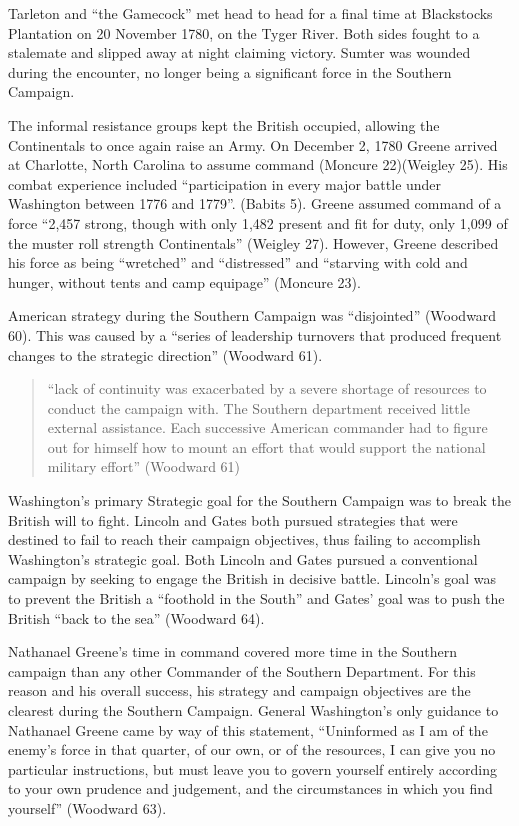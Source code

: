 Tarleton and ``the Gamecock'' met head to head for a final time at Blackstocks Plantation on 20 November 1780, on the Tyger River.  Both sides fought to a stalemate and slipped away at night claiming victory.  Sumter was wounded during the encounter, no longer being a significant force in the Southern Campaign. 

The informal resistance groups kept the British occupied, allowing the Continentals to once again raise an Army.  On December 2, 1780 Greene arrived at Charlotte, North Carolina to assume command (Moncure 22)(Weigley 25).  His combat experience included ``participation in every major battle under Washington between 1776 and 1779''. (Babits 5).  Greene assumed command of a force ``2,457 strong, though with only 1,482 present and fit for duty, only 1,099 of the muster roll strength Continentals''  (Weigley 27).   However, Greene described his force as being ``wretched'' and ``distressed'' and ``starving with cold and hunger, without tents and camp equipage'' (Moncure 23). 

American strategy during the Southern Campaign was ``disjointed'' (Woodward 60). This was caused by a ``series of leadership turnovers that produced frequent changes to the strategic direction'' (Woodward 61).  

\begin{quote}
``lack of continuity was exacerbated by a severe shortage of resources to conduct the campaign with.  The Southern department received little external assistance.  Each successive American commander had to figure out for himself how to mount an effort that would support the national military effort'' (Woodward 61)
\end{quote}

Washington's primary Strategic goal for the Southern Campaign was to break the British will to fight.  Lincoln and Gates both pursued strategies that were destined to fail to reach their campaign objectives, thus failing to accomplish Washington's strategic goal.  Both Lincoln and Gates pursued a conventional campaign by seeking to engage the British in decisive battle.  Lincoln's goal was to prevent the British a ``foothold in the South'' and Gates' goal was to push the British ``back to the sea'' (Woodward 64).  

Nathanael Greene's time in command covered more time in the Southern campaign than any other Commander of the Southern Department.  For this reason and his overall success, his strategy and campaign objectives are the clearest during the Southern Campaign.  General Washington's only guidance to Nathanael Greene came by way of this statement, ``Uninformed as I am of the enemy's force in that quarter, of our own, or of the resources, I can give you no particular instructions, but must leave you to govern yourself entirely according to your own prudence and judgement, and the circumstances in which you find yourself''  (Woodward 63).


